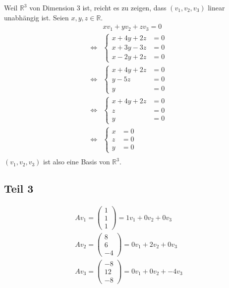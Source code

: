 \documentclass[a4paper,10pt]{article}
\begin{document}
Weil $\mathbb{R}^3$ von Dimension $3$ ist, reicht es zu zeigen, dass $(v_1, v_2, v_3)$ linear unabhängig ist.
Seien $x, y, z \in \mathbb{R}$.
\begin{align*}
 & xv_1 + yv_2 + zv_3 = 0\\
 \Leftrightarrow &
  \begin{cases}
   x + 4y + 2z & = 0\\
   x + 3y - 3z & = 0\\
   x - 2y + 2z & = 0
  \end{cases}\\
 \Leftrightarrow &
  \begin{cases}
   x + 4y + 2z & = 0\\
   y - 5z & = 0\\
   y & = 0
  \end{cases}\\
 \Leftrightarrow &
  \begin{cases}
   x + 4y + 2z & = 0\\
   z & = 0\\
   y & = 0
  \end{cases}\\
  \Leftrightarrow &
  \begin{cases}
   x & = 0\\
   z & = 0\\
   y & = 0
  \end{cases}\\
\end{align*}
$(v_1, v_2, v_3)$ ist also eine Basis von $\mathbb{R}^3$.

\subsection*{Teil 3}

\begin{align*}
 A v_1 =
  \begin{pmatrix}
   1\\
   1\\
   1
  \end{pmatrix} =
  1v_1 + 0v_2 + 0v_3\\
 A v_2 =
  \begin{pmatrix}
   8\\
   6\\
   -4
  \end{pmatrix} =
  0v_1 + 2v_2 + 0v_3\\
 A v_3 =
  \begin{pmatrix}
   -8\\
   12\\
   -8
  \end{pmatrix} =
  0v_1 + 0v_2 + -4v_3\\
\end{align*}
\end{document}
